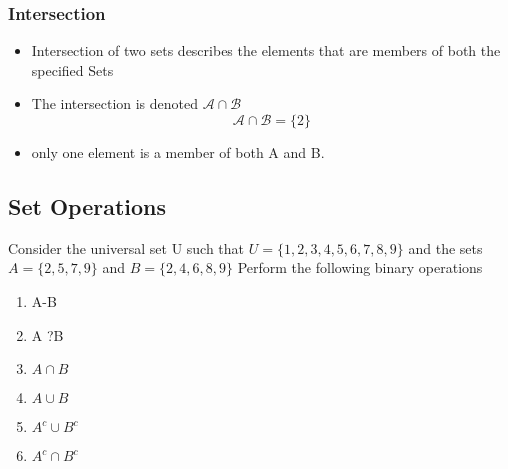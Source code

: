 \documentclass[12pt]{article}
\begin{document}
\subsubsection*{Intersection}
\begin{itemize}
\item Intersection of two sets describes the elements that are members of both the specified Sets
\item The intersection is denoted $\mathcal{A\cap B}$
\[ \mathcal{A\cap B} = \{2\}\]
\item only one element is a member of both A and B.
\end{itemize}

\subsection{Set Operations}
Consider the universal set U such that $U=\{1,2,3,4,5,6,7,8,9\}$  and the sets $A=\{2,5,7,9\}$  and  $B=\{2,4,6,8,9\}$
Perform the following binary operations
\begin{enumerate}
\item A-B
\item  A ?B
\item  $A \cap B$
\item $A\cup B$
\item $A^{c} \cup B^{c}$
\item $A^{c}\cap B^{c}$
\end{enumerate}
\end{document}
